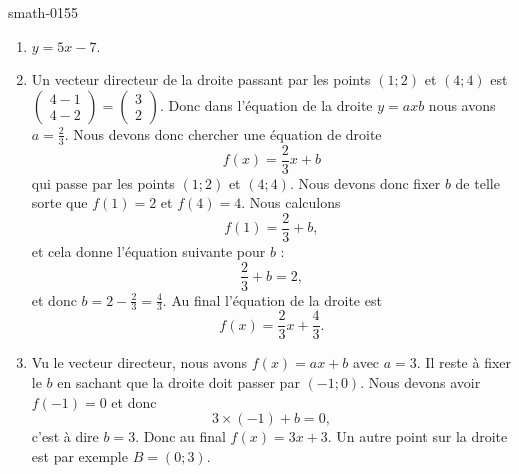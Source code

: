 
\begin{corrige}{smath-0155}

    \begin{enumerate}
        \item
            \( y=5x-7\).
        \item
            Un vecteur directeur de la droite passant par les points $(1;2)$ et $(4;4)$ est \( \begin{pmatrix}
                4-1    \\ 
                4-2    
            \end{pmatrix}=\begin{pmatrix}
                3    \\ 
                2    
            \end{pmatrix}\). Donc dans l'équation de la droite \( y=axb\) nous avons \( a=\frac{ 2 }{ 3 }\). Nous devons donc chercher une équation de droite 
            \begin{equation}
                f(x)=\frac{ 2 }{ 3 }x+b
            \end{equation}
            qui passe par les points \( (1;2)\) et \( (4;4)\). Nous devons donc fixer \( b\) de telle sorte que \( f(1)=2\) et \( f(4)=4\). Nous calculons
            \begin{equation}
                f(1)=\frac{ 2 }{ 3 }+b,
            \end{equation}
            et cela donne l'équation suivante pour \( b\) :
            \begin{equation}
                \frac{ 2 }{ 3 }+b=2,
            \end{equation}
            et donc \( b=2-\frac{ 2 }{ 3 }=\frac{ 4 }{ 3 }\). Au final l'équation de la droite est
            \begin{equation}
                f(x)=\frac{ 2 }{ 3 }x+\frac{ 4 }{ 3 }.
            \end{equation}
        \item
            Vu le vecteur directeur, nous avons \( f(x)=ax+b\) avec \( a=3\). Il reste à fixer le \( b\) en sachant que la droite doit passer par \( (-1;0)\). Nous devons avoir \( f(-1)=0\) et donc
            \begin{equation}
                3\times (-1)+b=0,
            \end{equation}
            c'est à dire \( b=3\). Donc au final \( f(x)=3x+3\). Un autre point sur la droite est par exemple \( B=(0;3)\).
            

\end{enumerate}
\end{corrige}
